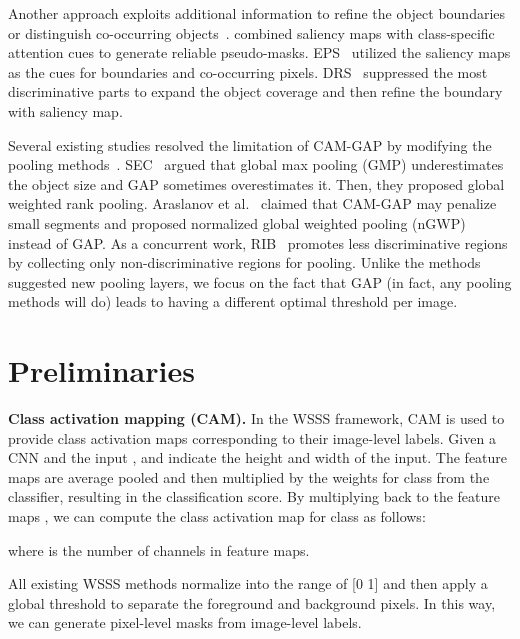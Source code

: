 \documentclass[10pt,twocolumn,letterpaper]{article}
\begin{document}
Another approach exploits additional information to refine the object boundaries or distinguish co-occurring objects~\cite{wei2016stc,fan2020employing,zeng2019joint}. \cite{chaudhry_dcsp_2017,yao2020saliency} combined saliency maps with class-specific attention cues to generate reliable pseudo-masks. EPS~\cite{Lee_2021_CVPR} utilized the saliency maps as the cues for boundaries and co-occurring pixels. DRS~\cite{KimHK21DRS} suppressed the most discriminative parts to expand the object coverage and then refine the boundary with saliency map.

Several existing studies resolved the limitation of CAM-GAP by modifying the pooling methods~\cite{kolesnikov2016seed, araslanov2020single, lee2021reducing}. SEC~\cite{kolesnikov2016seed} argued that global max pooling (GMP) underestimates the object size and GAP sometimes overestimates it. Then, they proposed global weighted rank pooling. Araslanov et al.~\cite{araslanov2020single} claimed that CAM-GAP may penalize small segments and proposed normalized global weighted pooling (nGWP) instead of GAP. As a concurrent work, RIB~\cite{lee2021reducing} promotes less discriminative regions by collecting only non-discriminative regions for pooling. Unlike the methods suggested new pooling layers, we focus on the fact that GAP (in fact, any pooling methods will do) leads to having a different optimal threshold per image. \section{Preliminaries}\label{section:3}

\noindent\textbf{Class activation mapping (CAM).} In the WSSS framework, CAM is used to provide class activation maps corresponding to their image-level labels. Given a CNN  and the input ,  and  indicate the height and width of the input. The feature maps are average pooled and then multiplied by the weights  for class  from the classifier, resulting in the classification score. By multiplying  back to the feature maps , we can compute the class activation map  for class  as follows:
\vspace{-2mm}
\vspace{-2mm}

\noindent where  is the number of channels in feature maps. 

All existing WSSS methods normalize  into the range of [0 1] and then apply a global threshold to separate the foreground and background pixels. In this way, we can generate pixel-level masks from image-level labels.
\end{document}
